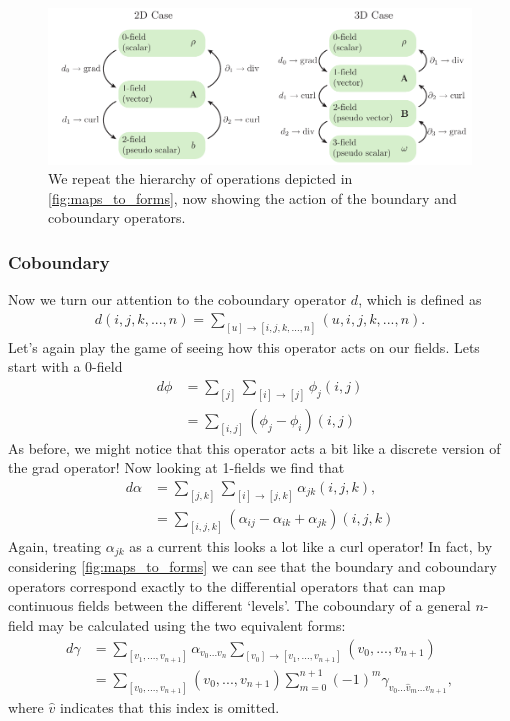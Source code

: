 \documentclass[11pt, oneside]{article} %
\numberwithin{equation}{section}
\begin{document}
\begin{figure}
    \centering
    \includegraphics[width=\linewidth]{figs/maps_to_forms_boundaries.pdf}
    \caption{We repeat the hierarchy of operations depicted in \cref{fig:maps_to_forms}, now showing the action of the boundary and coboundary operators.}
    \label{fig:maps_to_forms_boundaries}
\end{figure}



\subsubsection{Coboundary}

Now we turn our attention to the coboundary operator $d$, which is defined as 
\begin{align}
    d(i,j,k,...,n) = \sum_{[u]\rightarrow [i,j,k,...,n]}(u,i,j,k,...,n).
\end{align}
Let's again play the game of seeing how this operator acts on our fields. Lets start with a 0-field
\begin{align}
    d\phi &= \sum_{[j]} \sum_{[i]\rightarrow [j]} \phi_j (i,j) \\
    & = \sum_{[i,j]}(\phi_j - \phi_i) (i,j)
\end{align}
As before, we might notice that this operator acts a bit like a discrete version of the grad operator! Now looking at 1-fields we find that
\begin{align}
    d\alpha &= \sum_{[j,k]} \sum_{[i]\rightarrow [j,k]} \alpha_{jk} (i,j,k), \\
    & = \sum_{[i,j,k]}(\alpha_{ij} - \alpha_{ik} + \alpha_{jk}) (i,j,k)
\end{align}
Again, treating $\alpha_{jk}$ as a current this looks a lot like a curl operator! In fact, by considering \cref{fig:maps_to_forms} we can see that the boundary and coboundary operators correspond exactly to the differential operators that can map continuous fields between the different `levels'. The coboundary of a general $n$-field may be calculated using the two equivalent forms:
\begin{align}
    d\gamma
    & = \sum_{[v_1, ... , v_{n+1}]}\alpha_{v_0...v_n}\sum_{[v_0]\rightarrow [v_1, ... , v_{n+1}]}
    (v_0, ... , v_{n+1})
    \\
    &= \sum_{[v_0, ... , v_{n+1}]}
    (v_0, ... , v_{n+1})
    \sum_{m = 0}^{n+1}(-1)^m
    \gamma_{v_0...\hat v_m...v_{n+1}},
\end{align}
where $\hat v$ indicates that this index is omitted.
\end{document}
